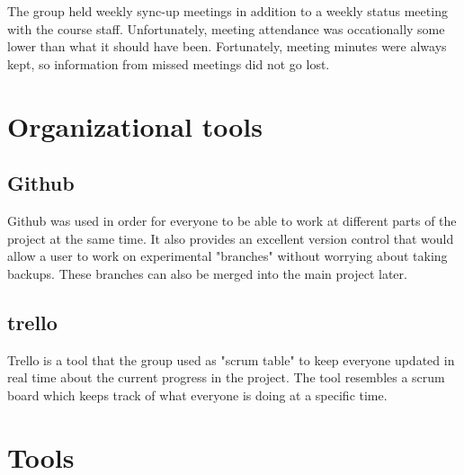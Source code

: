 The group held weekly sync-up meetings in addition to a weekly status meeting with the course staff.
Unfortunately, meeting attendance was occationally some lower than what it should have been.
Fortunately, meeting minutes were always kept, so information from missed meetings did not go lost.

\section{Organizational tools}
\subsection{Github}
Github was used in order for everyone to be able to work at different parts of the project at the same time.
It also provides an excellent version control that would allow a user to work on experimental "branches" without
worrying about taking backups. These branches can also be merged into the main project later.
\subsection{trello}
Trello is a tool that the group used as "scrum table" to keep everyone updated in real time about the current progress in the project.
The tool resembles a scrum board which keeps track of what everyone is doing at a specific time.

\section{Tools}



